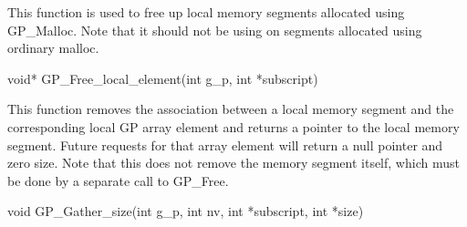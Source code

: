 \documentclass[12pt]{article}
\begin{document}
\local

\begin{desc}

This function is used to free up local memory segments allocated using
GP\_Malloc. Note that it should not be using on segments allocated using ordinary
malloc.

\end{desc}



\begin{capi}
\begin{ccode}
void* GP_Free_local_element(int g_p, int *subscript)
\end{ccode}
\begin{funcargs}
\end{funcargs}
\end{capi}

\local

\begin{desc}

This function removes the association between a local memory segment and the
corresponding local GP array element and returns a pointer to the local memory
segment. Future requests for that array element
will return a null pointer and zero size. Note that this does not remove the
memory segment itself, which must be done by a separate call to GP\_Free.

\end{desc}



\begin{capi}
\begin{ccode}
void GP_Gather_size(int g_p, int nv, int *subscript, int *size)
\end{ccode}
\begin{funcargs}
\end{funcargs}
\end{capi}
\end{document}
